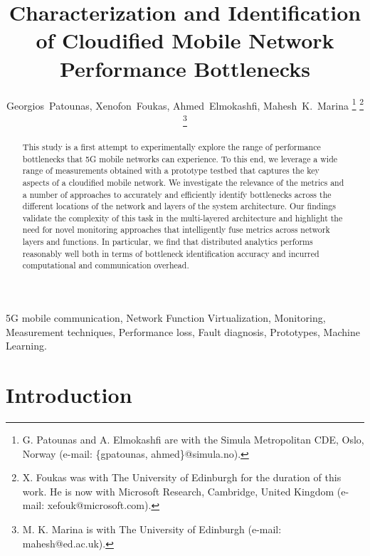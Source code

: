 \documentclass[journal,comsoc]{IEEEtran}
\begin{document}
\title{Characterization and Identification of Cloudified Mobile Network Performance Bottlenecks}

\author{Georgios~Patounas,
 Xenofon~Foukas,
 Ahmed~Elmokashfi,
 Mahesh~K.~Marina%
 \thanks{ G. Patounas and A. Elmokashfi are with the Simula Metropolitan CDE, Oslo, Norway (e-mail: \{gpatounas, ahmed\}@simula.no).}
 \thanks{ X. Foukas was with The University of Edinburgh for the duration of this work. He is now with Microsoft Research, Cambridge, United Kingdom (e-mail: xefouk@microsoft.com).}
 \thanks{ M. K. Marina is with The University of Edinburgh (e-mail: mahesh@ed.ac.uk).}}

\maketitle

%
\begin{abstract}
This study is a first attempt to experimentally explore the range of performance bottlenecks that 5G mobile networks can experience. 
To this end, we leverage a wide range of measurements obtained with a prototype testbed that captures the key aspects of a cloudified mobile network. We investigate the relevance of the metrics and a number of approaches to accurately and efficiently identify bottlenecks across the different locations of the network and layers of the system architecture. Our findings validate the complexity of this task in the multi-layered architecture and highlight the need for novel monitoring approaches that intelligently fuse metrics across network layers and functions. In particular, we find that distributed analytics performs reasonably well both in terms of bottleneck identification accuracy and incurred computational and communication overhead.   
\end{abstract}

%
\begin{IEEEkeywords}
5G mobile communication, Network Function Virtualization, Monitoring, Measurement techniques, Performance loss, Fault diagnosis, Prototypes, Machine Learning.
\end{IEEEkeywords}

% 

\section{Introduction}
\label{sec:intro}
\end{document}

